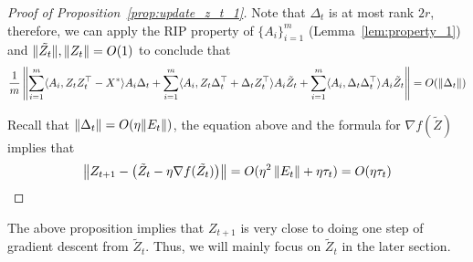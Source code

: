\begin{proof}[Proof of Proposition~\ref{prop:update_z_t_1}]
Note that $\Delta_t$ is at most rank $2r$, therefore, we can apply the RIP property of $\{ A_i \}_{i = 1}^m$ (Lemma~\ref{lem:property_1}) and $\|\tilde{Z_t}\|, 
\|Z_t\| = O(1)$ to conclude that 
\begin{align}
\frac{1}{m} \left\| \sum_{i = 1}^m \langle A_i, Z_t Z_t^{\top}  - X^* \rangle A_i  \Delta_t
+    \sum_{i = 1}^m \langle A_i, Z_t \Delta_t^{\top} + \Delta_t Z_t^{\top} \rangle A_i \tilde{Z}_t  +    \sum_{i = 1}^m \langle A_i, \Delta_t \Delta_t^{\top} \rangle A_i \tilde{Z}_t \right\| = O(\left\|\Delta_t\right\|)\nonumber
\end{align}

\noindent Recall that $\left\|\Delta_t\right\| = O(\eta \| E_t \|)$, the equation above and the formula for $\nabla f(\tilde{Z})$ implies that
\begin{align}
\left\|Z_{t + 1} - \left(\tilde{Z}_t - \eta \nabla f(\tilde{Z_t}) \right)\right\| = O(\eta^2 \left\|E_t\right\|+  \eta \tau_t) = O(\eta \tau_t)\nonumber
\end{align}


\end{proof}
\noindent
The above proposition implies that $Z_{t + 1}$ is very close to doing one step of gradient descent from $\tilde{Z}_t$. Thus, we will mainly focus on $\tilde{Z}_t$ in the later section. 

